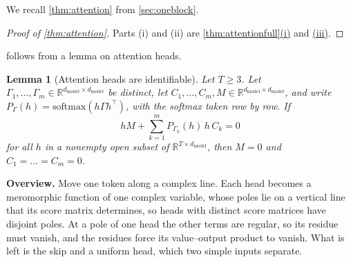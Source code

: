 \documentclass[10pt]{article}
\newtheorem{lemma}[theorem]{Lemma}
\theoremstyle{definition}
\theoremstyle{remark}
\newcommand{\R}{\mathbb{R}}
\newcommand{\dm}{d_{\mathrm{model}}}
\newcommand{\para}[1]{\smallskip\noindent\textbf{#1}\hspace{0.5em}}
\DeclareRobustCommand{\cpref}[2]{\hyperref[#1:#2]{\cref*{#1}(#2)}}
\DeclareRobustCommand{\ptlink}[2]{\hyperref[#1:#2]{(#2)}}
\begin{document}
We recall \cref{thm:attention} from \cref{sec:oneblock}.
\thmAttention*

\begin{proof}[Proof of \cref{thm:attention}]
Parts (i) and (ii) are \cpref{thm:attentionfull}{i} and \ptlink{thm:attentionfull}{iii}.
\end{proof}

 follows from a lemma on attention heads.

\begin{lemma}[Attention heads are identifiable]\label{lem:heads}
Let $T \ge 3$. Let $\Gamma_1, \dots, \Gamma_m \in \R^{\dm\times\dm}$ be distinct, let $C_1, \dots, C_m, M \in \R^{\dm\times\dm}$, and write $P_\Gamma(h) = \mathrm{softmax}(h\Gamma h^\top)$, with the softmax taken row by row. If
\[
hM + \sum_{k=1}^{m} P_{\Gamma_k}(h)\, h\, C_k = 0
\]
for all $h$ in a nonempty open subset of $\R^{T\times\dm}$, then $M = 0$ and $C_1 = \dots = C_m = 0$.
\end{lemma}

\para{Overview.} Move one token along a complex line. Each head becomes a meromorphic function of one complex variable, whose poles lie on a vertical line that its score matrix determines, so heads with distinct score matrices have disjoint poles. At a pole of one head the other terms are regular, so its residue must vanish, and the residues force its value--output product to vanish. What is left is the skip and a uniform head, which two simple inputs separate.
\end{document}
